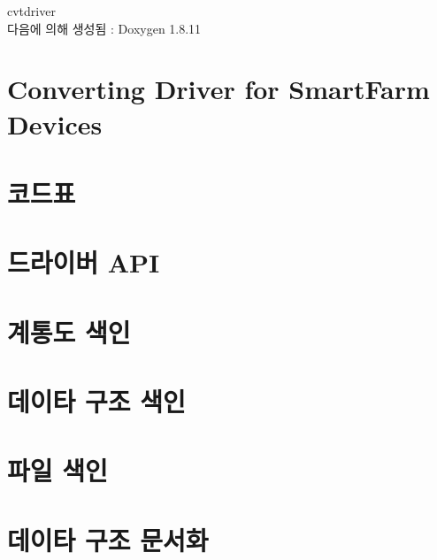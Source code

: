 \documentclass[twoside]{book}
\newcommand{\+}{\discretionary{\mbox{\scriptsize$\hookleftarrow$}}{}{}}
\newcommand{\clearemptydoublepage}{%
  \newpage{\pagestyle{empty}\cleardoublepage}%
}
\begin{document}
\hypersetup{pageanchor=false,
             bookmarksnumbered=true,
             pdfencoding=unicode
            }
\begin{titlepage}
\vspace*{7cm}
\begin{center}%
{\Large cvtdriver }\\
\vspace*{1cm}
{\large 다음에 의해 생성됨 \+:  Doxygen 1.8.11}\\
\end{center}
\end{titlepage}
\clearemptydoublepage
\tableofcontents
\clearemptydoublepage
{}
\hypersetup{pageanchor=true}

\chapter{Converting Driver for Smart\+Farm Devices}
\label{index}\hypertarget{index}{}
\chapter{코드표}
\label{md_doc_code_table}
\hypertarget{md_doc_code_table}{}

\chapter{드라이버 A\+PI}
\label{md_doc_driver_api}
\hypertarget{md_doc_driver_api}{}

\chapter{계통도 색인}

\chapter{데이타 구조 색인}

\chapter{파일 색인}

\chapter{데이타 구조 문서화}
















\end{document}
